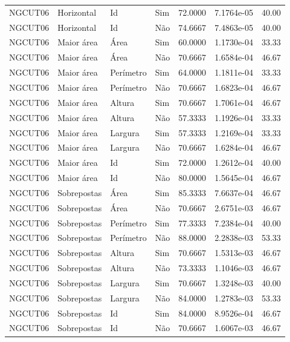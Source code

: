 \begin{tabular}{llllrrr}
    NGCUT06   & Horizontal  & Id        & Sim         & 72.0000      & 7.1764e-05 & 40.00    \\
    NGCUT06   & Horizontal  & Id        & Não         & 74.6667      & 7.4863e-05 & 40.00    \\
    NGCUT06   & Maior área  & Área      & Sim         & 60.0000      & 1.1730e-04 & 33.33    \\
    NGCUT06   & Maior área  & Área      & Não         & 70.6667      & 1.6584e-04 & 46.67    \\
    NGCUT06   & Maior área  & Perímetro & Sim         & 64.0000      & 1.1811e-04 & 33.33    \\
    NGCUT06   & Maior área  & Perímetro & Não         & 70.6667      & 1.6823e-04 & 46.67    \\
    NGCUT06   & Maior área  & Altura    & Sim         & 70.6667      & 1.7061e-04 & 46.67    \\
    NGCUT06   & Maior área  & Altura    & Não         & 57.3333      & 1.1926e-04 & 33.33    \\
    NGCUT06   & Maior área  & Largura   & Sim         & 57.3333      & 1.2169e-04 & 33.33    \\
    NGCUT06   & Maior área  & Largura   & Não         & 70.6667      & 1.6284e-04 & 46.67    \\
    NGCUT06   & Maior área  & Id        & Sim         & 72.0000      & 1.2612e-04 & 40.00    \\
    NGCUT06   & Maior área  & Id        & Não         & 80.0000      & 1.5645e-04 & 46.67    \\
    NGCUT06   & Sobrepostas & Área      & Sim         & 85.3333      & 7.6637e-04 & 46.67    \\
    NGCUT06   & Sobrepostas & Área      & Não         & 70.6667      & 2.6751e-03 & 46.67    \\
    NGCUT06   & Sobrepostas & Perímetro & Sim         & 77.3333      & 7.2384e-04 & 40.00    \\
    NGCUT06   & Sobrepostas & Perímetro & Não         & 88.0000      & 2.2838e-03 & 53.33    \\
    NGCUT06   & Sobrepostas & Altura    & Sim         & 70.6667      & 1.5313e-03 & 46.67    \\
    NGCUT06   & Sobrepostas & Altura    & Não         & 73.3333      & 1.1046e-03 & 46.67    \\
    NGCUT06   & Sobrepostas & Largura   & Sim         & 70.6667      & 1.3248e-03 & 40.00    \\
    NGCUT06   & Sobrepostas & Largura   & Não         & 84.0000      & 1.2783e-03 & 53.33    \\
    NGCUT06   & Sobrepostas & Id        & Sim         & 84.0000      & 8.9526e-04 & 46.67    \\
    NGCUT06   & Sobrepostas & Id        & Não         & 70.6667      & 1.6067e-03 & 46.67    \\
    \hline
\end{tabular}